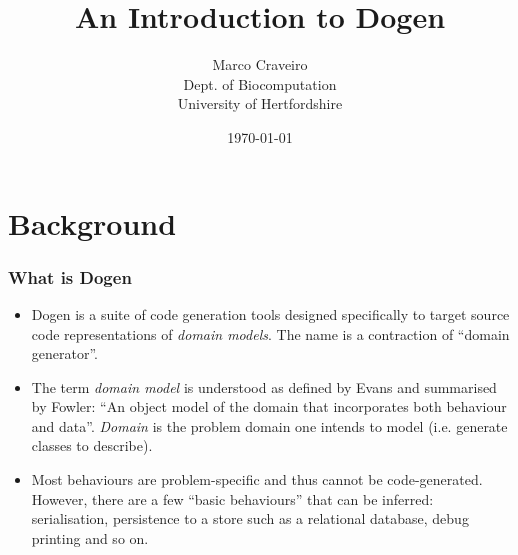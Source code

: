 \documentclass{beamer}
\title{An Introduction to Dogen}
\author{Marco Craveiro \\
    Dept. of Biocomputation \\
    University of Hertfordshire
}
\date{\today}
\begin{document}

\section{Background}

\begin{frame}
\frametitle{What is Dogen}

\begin{itemize}

\item Dogen is a suite of code generation tools designed specifically
  to target source code representations of \emph{domain models}. The
  name is a contraction of ``domain generator''.

\pause

\item The term \emph{domain model} is understood as defined by Evans
  and summarised by Fowler: ``An object model of the domain that
  incorporates both behaviour and data''. \emph{Domain} is the problem
  domain one intends to model (i.e. generate classes to describe).

\pause

\item Most behaviours are problem-specific and thus cannot be
  code-generated. However, there are a few ``basic behaviours'' that
  can be inferred: serialisation, persistence to a store such as a
  relational database, debug printing and so on.

\end{itemize}

\end{frame}
\end{document}
